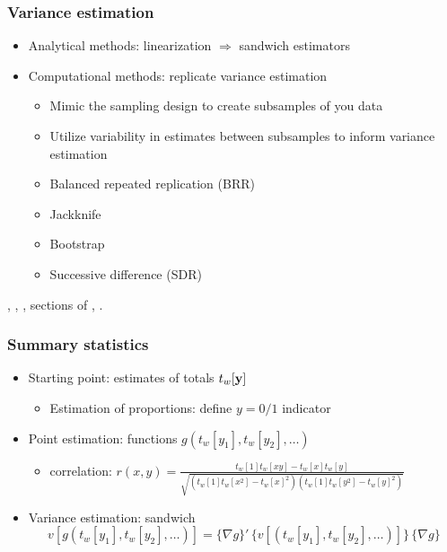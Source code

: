 \documentclass{beamer}
\begin{document}
\begin{frame}\frametitle{Variance estimation}

\begin{itemize}
    \item Analytical methods: linearization $\Rightarrow$ sandwich estimators
    \item Computational methods: replicate variance estimation
    \begin{itemize}
        \item Mimic the sampling design to create subsamples of you data
        \item Utilize variability in estimates between subsamples to inform variance estimation
        \item Balanced repeated replication (BRR)
        \item Jackknife
        \item Bootstrap
        \item Successive difference (SDR)
    \end{itemize}
\end{itemize}

\bigskip

\citet{shao:1996}, \citet{rust:rao:1996}, \citet{kolenikov:2010}, sections of \citet{heeringa:west:berglund:2017}, \citet{lumley:2010}.

\end{frame}


\begin{frame}\frametitle{Summary statistics}

\begin{itemize}
    \item Starting point: estimates of totals $t_w[{\bf y}]$
        \begin{itemize} \item Estimation of proportions: define $y=0/1$ indicator \end{itemize}
    \item Point estimation: functions $g(t_w[y_1], t_w[y_2], \ldots)$
        \begin{itemize}
            \item correlation: $r(x,y) = \frac{t_w[1]t_w[xy]-t_w[x]t_w[y]}%
                {\sqrt{(t_w[1]t_w[x^2]-t_w[x]^2)(t_w[1]t_w[y^2]-t_w[y]^2)}}$
        \end{itemize}
    \item Variance estimation: sandwich
        $$
            v[g(t_w[y_1], t_w[y_2], \ldots)] = \{\nabla g\}' \, \{ v[(t_w[y_1], t_w[y_2], \ldots)] \} \, \{\nabla g \}
        $$
\end{itemize}

\end{frame}
\end{document}
